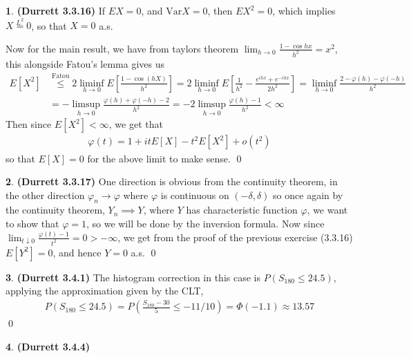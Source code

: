 \documentclass[10.5pt]{article}
\theoremstyle{definition}
\newtheorem{pb}{}
\newcommand{\var}{\text{Var}}
\begin{document}
    \begin{pb}\textbf{(Durrett 3.3.16)}
        If \(EX = 0\), and \(\var X = 0\), then \(EX^2 = 0\), which implies \(X \overset{L^2}{=} 0\), so that \(X = 0\) a.s.

        Now for the main result, we have from taylors theorem \(\lim_{h\to 0}\frac{1 - \cos hx}{h^2} = x^2\), this alongside Fatou's lemma gives us
        \begin{align*}
            E[X^2] &\overset{\text{Fatou}}{\leq} 2\liminf_{h\to 0}E\left[\frac{1-\cos(hX)}{h^2}\right] = 2\liminf_{h\to0}E\left[\frac{1}{h^2} - \frac{e^{ihx} + e^{-ihx}}{2h^2}\right] = \liminf_{h\to 0}\frac{2 - \varphi(h) - \varphi(-h)}{h^2} \\
            &= - \limsup_{h\to 0} \frac{\varphi(h) + \varphi(-h) - 2}{h^2} = -2\limsup_{h \to 0}\frac{\varphi(h)-1}{h^2} < \infty
        \end{align*}
        Then since \(E[X^2] < \infty\), we get that
        \begin{align*}
            \varphi(t) = 1 +itE[X] -t^2E[X^2] + o(t^2)
        \end{align*} so that \(E[X] = 0\) for the above limit to make sense. \qed
    \end{pb}
    \begin{pb}\textbf{(Durrett 3.3.17)}
        One direction is obvious from the continuity theorem, in the other direction \(\varphi_n \to \varphi\) where \(\varphi\) is continuous on \((-\delta,\delta)\) so once again by the continuity theorem, \(Y_n \implies Y\), where \(Y\) has characteristic function \(\varphi\), we want to show that \(\varphi = 1\), so we will be done by the inversion formula. Now since \(\lim_{t\downarrow 0}\frac{\varphi(t) - 1}{t^2} = 0 > -\infty\), we get from the proof of the previous exercise (3.3.16) \(E[Y^2] = 0\), and hence \(Y = 0\) a.s. \qed
    \end{pb}
    \begin{pb}\textbf{(Durrett 3.4.1)}
        The histogram correction in this case is \(P(S_{180} \leq 24.5)\), applying the approximation given by the CLT,
        \begin{align*}
            P(S_{180} \leq 24.5) = P\left(\frac{S_{180}-30}{5} \leq -11/10\right) = \Phi(-1.1) \approx 13.57
        \end{align*} \qed
    \end{pb}
    \begin{pb}\textbf{(Durrett 3.4.4)}
        
    \end{pb}
\end{document}
